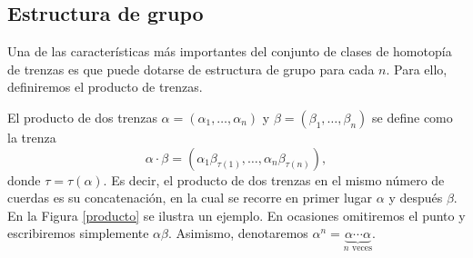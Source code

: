 \documentclass[TFG.tex]{subfiles}
\begin{document}
\subsection{Estructura de grupo}
Una de las características más importantes del conjunto de clases de homotopía de trenzas es que puede dotarse de estructura de grupo para cada $n$. Para ello, definiremos el producto de trenzas. 

\begin{defi}
El producto de dos trenzas $\alpha=(\alpha_1,\dots, \alpha_n)$ y $\beta=(\beta_1,\dots,\beta_n)$ se define como la trenza
$$\alpha\cdot\beta = (\alpha_1\beta_{\tau(1)},\dots, \alpha_n\beta_{\tau(n)}),$$
donde $\tau=\tau(\alpha)$. Es decir, el producto de dos trenzas en el mismo número de cuerdas es su concatenación, en la cual se recorre en primer lugar $\alpha$ y después $\beta$. En la Figura \ref{producto} se ilustra un ejemplo. En ocasiones omitiremos el punto y escribiremos simplemente $\alpha\beta$. Asimismo, denotaremos $\alpha^n=\underbrace{\alpha\cdots\alpha}_{n\text{ veces}}$.
\end{defi}
\end{document}
